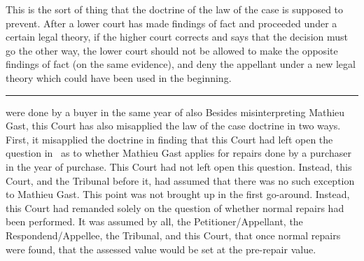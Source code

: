 \documentclass[12pt,\documentclassflag]{michiganCourtOfAppealsBrief}
\begin{document}
 This is the sort of thing that the doctrine of the law of the case is supposed to prevent. After a lower court has made findings of fact and proceeded under a certain legal theory, if the higher court corrects and says that the decision must go the other way, the lower court should not be allowed to make the opposite findings of fact (on the same evidence), and deny the appellant under a new legal theory which could have been used in the beginning.

 \hrule
 
   were done by a buyer in the same year of
   also 
Besides misinterpreting Mathieu Gast, this Court has also misapplied the law of the case doctrine in two ways. First, it misapplied the doctrine in finding that this Court had left open the question in \cite{Patru 1}\ as to whether Mathieu Gast applies for repairs done by a purchaser in the year of purchase. This Court had not left open this question. Instead, this Court, and the Tribunal before it, had assumed that there was no such exception to Mathieu Gast. This point was not brought up in the first go-around.
Instead, this Court had remanded solely on the question of whether normal repairs had been performed. 
It was assumed by all, the Petitioner/Appellant, the Respondend/Appellee, the Tribunal, and this Court, that once normal repairs were found, that the assessed value would be set at the pre-repair value.
\end{document}
